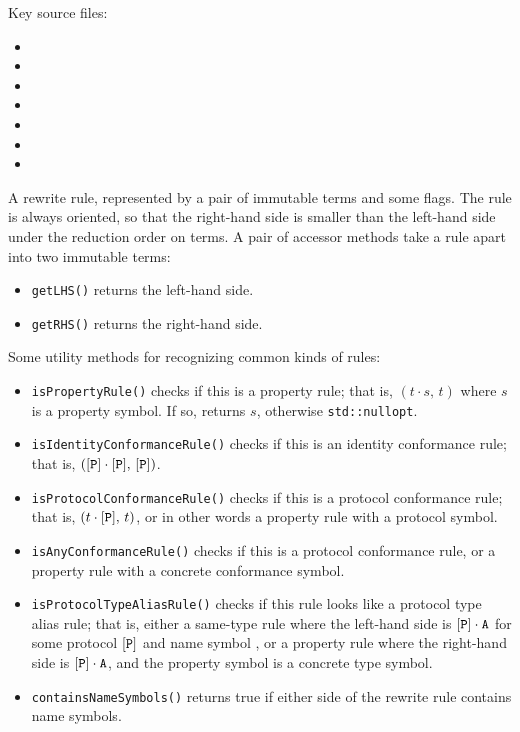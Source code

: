 \documentclass[../generics]{subfiles}
\begin{document}
Key source files:
\begin{itemize}
\item {}
\item {}
\item {}
\item {}
\item {}
\item {}
\item {}
\end{itemize}

A rewrite rule, represented by a pair of immutable terms and some flags. The rule is always oriented, so that the right-hand side is smaller than the left-hand side under the reduction order on terms. A pair of accessor methods take a rule apart into two immutable terms:
\begin{itemize}
\item \texttt{getLHS()} returns the left-hand side.
\item \texttt{getRHS()} returns the right-hand side.
\end{itemize}
Some utility methods for recognizing common kinds of rules:
\begin{itemize}
\item \texttt{isPropertyRule()} checks if this is a property rule; that is, $(t\cdot s,\,t)$ where $s$ is a property symbol. If so, returns $s$, otherwise \texttt{std::nullopt}.
\item \texttt{isIdentityConformanceRule()} checks if this is an identity conformance rule; that is, $([\texttt{P}]\cdot[\texttt{P}],\,[\texttt{P}])$.
\item \texttt{isProtocolConformanceRule()} checks if this is a protocol conformance rule; that is, $(t\cdot[\texttt{P}],\,t)$, or in other words a property rule with a protocol symbol.
\item \texttt{isAnyConformanceRule()} checks if this is a protocol conformance rule, or a property rule with a concrete conformance symbol.
\item \texttt{isProtocolTypeAliasRule()} checks if this rule looks like a protocol type alias rule; that is, either a same-type rule where the left-hand side is $[\texttt{P}]\cdot\texttt{A}$ for some protocol $[\texttt{P}]$ and name symbol \nA, or a property rule where the right-hand side is $[\texttt{P}]\cdot\texttt{A}$, and the property symbol is a concrete type symbol.
\item \texttt{containsNameSymbols()} returns true if either side of the rewrite rule contains name symbols.
\end{itemize}
\end{document}
